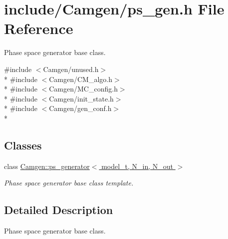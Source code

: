 \hypertarget{a00716}{\section{include/\-Camgen/ps\-\_\-gen.h File Reference}
\label{a00716}
}


Phase space generator base class.  


{\ttfamily \#include $<$Camgen/unused.\-h$>$}\\*
{\ttfamily \#include $<$Camgen/\-C\-M\-\_\-algo.\-h$>$}\\*
{\ttfamily \#include $<$Camgen/\-M\-C\-\_\-config.\-h$>$}\\*
{\ttfamily \#include $<$Camgen/init\-\_\-state.\-h$>$}\\*
{\ttfamily \#include $<$Camgen/gen\-\_\-conf.\-h$>$}\\*
\subsection*{Classes}
\begin{DoxyCompactItemize}
\item 
class \hyperlink{a00441}{Camgen\-::ps\-\_\-generator$<$ model\-\_\-t, N\-\_\-in, N\-\_\-out $>$}
\begin{DoxyCompactList}\small\item\em Phase space generator base class template. \end{DoxyCompactList}\end{DoxyCompactItemize}


\subsection{Detailed Description}
Phase space generator base class. 